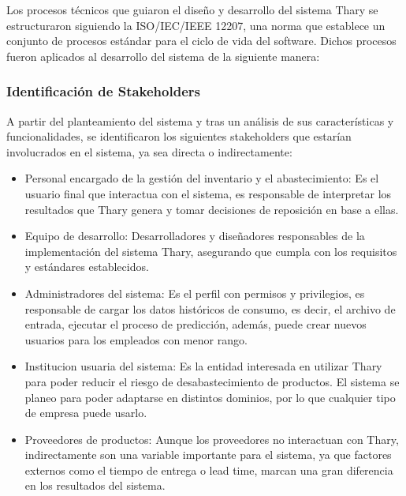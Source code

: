 Los procesos técnicos que guiaron el diseño y desarrollo del sistema Thary se estructuraron siguiendo la ISO/IEC/IEEE 12207, una norma que establece un conjunto de procesos estándar para el ciclo de vida del software. Dichos procesos fueron aplicados al desarrollo del sistema de la siguiente manera:

\subsubsection{Identificación de Stakeholders}
\label{sec:stakeholders}
A partir del planteamiento del sistema y tras un análisis de sus características y funcionalidades, se identificaron los siguientes stakeholders que estarían involucrados en el sistema, ya sea directa o indirectamente:

\begin{itemize}
    \item Personal encargado de la gestión del inventario y el abastecimiento: Es el usuario final que interactua con el sistema, es responsable de interpretar los resultados que Thary genera y tomar decisiones de reposición en base a ellas.
    \item Equipo de desarrollo: Desarrolladores y diseñadores responsables de la implementación del sistema Thary, asegurando que cumpla con los requisitos y estándares establecidos.
    \item Administradores del sistema: Es el perfil con permisos y privilegios, es responsable de cargar los datos históricos de consumo, es decir, el archivo de entrada, ejecutar el proceso de predicción, además, puede crear nuevos usuarios para los empleados con menor rango.
    \item Institucion usuaria del sistema: Es la entidad interesada en utilizar Thary para poder reducir el riesgo de desabastecimiento de productos. El sistema se planeo para poder adaptarse en distintos dominios, por lo que cualquier tipo de empresa puede usarlo.
    \item Proveedores de productos: Aunque los proveedores no interactuan con Thary, indirectamente son una variable importante para el sistema, ya que factores externos como el tiempo de entrega o lead time, marcan una gran diferencia en los resultados del sistema.
\end{itemize} 

